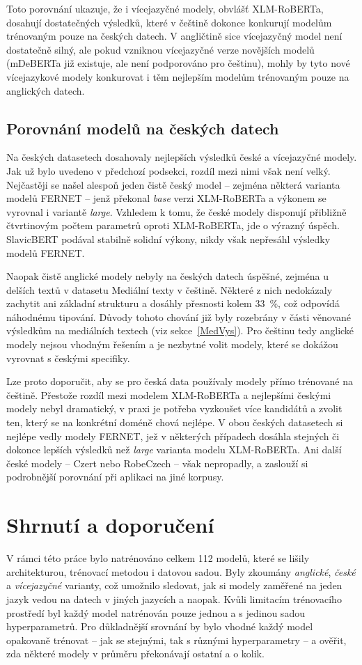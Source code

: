 Toto porovnání ukazuje, že i vícejazyčné modely, obvlášť XLM-RoBERTa, dosahují dostatečných výsledků, které v češtině dokonce konkurují modelům trénovaným pouze na českých datech. V angličtině sice vícejazyčný model není dostatečně silný, ale pokud vzniknou vícejazyčné verze novějších modelů (mDeBERTa již existuje, ale není podporováno pro češtinu), mohly by tyto nové vícejazykové modely konkurovat i těm nejlepším modelům trénovaným pouze na anglických datech.

\subsection{Porovnání modelů na českých datech}
Na českých datasetech dosahovaly nejlepších výsledků české a vícejazyčné modely. Jak už bylo uvedeno v předchozí podsekci, rozdíl mezi nimi však není velký. Nejčastěji se našel alespoň jeden čistě český model -- zejména některá varianta modelů FERNET -- jenž překonal \emph{base} verzi XLM-RoBERTa a výkonem se vyrovnal i variantě \emph{large}. Vzhledem k tomu, že české modely disponují přibližně čtvrtinovým počtem parametrů oproti XLM-RoBERTa, jde o výrazný úspěch. SlavicBERT podával stabilně solidní výkony, nikdy však nepřesáhl výsledky modelů FERNET.

Naopak čistě anglické modely nebyly na českých datech úspěšné, zejména u delších textů v datasetu Mediální texty v češtině. Některé z nich nedokázaly zachytit ani základní strukturu a dosáhly přesnosti kolem 33~\%, což odpovídá náhodnému tipování. Důvody tohoto chování již byly rozebrány v části věnované výsledkům na mediálních textech (viz sekce~\ref{MedVys}). Pro češtinu tedy anglické modely nejsou vhodným řešením a je nezbytné volit modely, které se dokážou vyrovnat s českými specifiky.

Lze proto doporučit, aby se pro česká data používaly modely přímo trénované na češtině. Přestože rozdíl mezi modelem XLM-RoBERTa a nejlepšími českými modely nebyl dramatický, v praxi je potřeba vyzkoušet více kandidátů a zvolit ten, který se na konkrétní doméně chová nejlépe. V obou českých datasetech si nejlépe vedly modely FERNET, jež v některých případech dosáhla stejných či dokonce lepších výsledků než \emph{large} varianta modelu XLM-RoBERTa. Ani další české modely -- Czert nebo RobeCzech -- však nepropadly, a zaslouží si podrobnější porovnání při aplikaci na jiné korpusy.

\section{Shrnutí a doporučení}
V rámci této práce bylo natrénováno celkem 112 modelů, které se lišily architekturou, trénovací metodou i datovou sadou. Byly zkoumány \emph{anglické}, \emph{české} a \emph{vícejazyčné} varianty, což umožnilo sledovat, jak si modely zaměřené na jeden jazyk vedou na datech v jiných jazycích a naopak. Kvůli limitacím trénovacího prostředí byl každý model natrénován pouze jednou a s jedinou sadou hyperparametrů. Pro důkladnější srovnání by bylo vhodné každý model opakovaně trénovat -- jak se stejnými, tak s různými hyperparametry -- a ověřit, zda některé modely v průměru překonávají ostatní a o kolik.

